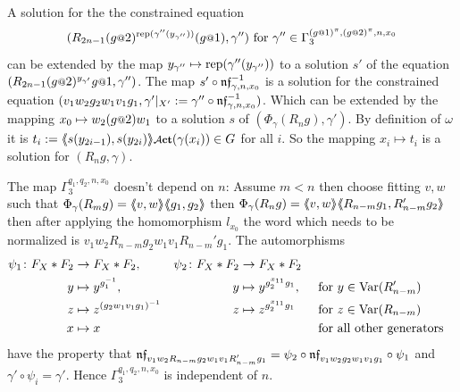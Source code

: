 \documentclass[a4paper,11pt]{amsart}
\begin{document}
 A solution for the the constrained equation
 \[(R_{2n-1}(g\at2)^{\textup{rep}(\gamma''({y_{\gamma''}}))}(g\at1),\gamma'')\textup{ for }\gamma'' \in \Gamma_3^{(g\at{1})^\pi,(g\at{2})^\pi,n,x_0}\]
 can be 
 extended by the map ${y_{\gamma''}}\mapsto \textup{rep}(\gamma''({y_{\gamma''}}))$ to a solution $s'$ 
 of the equation $(R_{2n-1} (g\at{2})^{{y_{\gamma'}}} g\at{1},\gamma'')$. The map $s'\circ \mathfrak{nf}_{\gamma,n,x_0}^{-1}$ 
 is a solution for the constrained equation $(v_1w_2g_2w_1v_1g_1,\gamma'|_{X'}:=\gamma'' \circ \mathfrak{nf}_{\gamma,n,x_0}^{-1})$.
 Which can be extended by the mapping $x_0\mapsto w_2(g\at{2})w_1$ to a solution $s$ of $(\Phi_\gamma(R_n g),\gamma')$.
 By definition of $\omega$ it is $t_i:=\pair{s(y_{2i-1}),s(y_{2i})}\act(\gamma(x_i)) \in G$ for all $i$. So the mapping $x_i\mapsto t_i$ is a solution for $(R_ng,\gamma)$.
 
 The map $\Gamma_3^{q_1,q_2,n,x_0}$ doesn't depend on %
 $n$: Assume $m<n$ then choose  
 fitting $v,w$ such that $\Phi_\gamma(R_mg)=\langle\negthickspace\langle v,w\rangle\negthickspace\rangle\langle\negthickspace\langle g_1,g_2\rangle\negthickspace\rangle$ then $\Phi_\gamma(R_ng)=\langle\negthickspace\langle v,w\rangle\negthickspace\rangle\langle\negthickspace\langle R_{n-m}g_1,R_{n-m}'g_2\rangle\negthickspace\rangle$ 
 then after applying the homomorphism $l_{x_0}$ 
 the word which needs to be normalized is $v_1w_2R_{n-m}g_2w_1v_1R_{n-m}'g_1$. The automorphisms
 \begin{align*}
 \psi_1 \colon F_X*F_2 &\to F_X*F_2, & \psi_2 \colon F_X*F_2 &\to F_X*F_2\\
 y &\mapsto y^{g_1^{-1}}, & y &\mapsto y^{g_2^{x_{11}}g_1}, & &\text{ for }y\in \textup{Var}(R_{n-m}')\\
 z &\mapsto z^{(g_2w_1v_1g_1)^{-1}}& z &\mapsto z^{g_2^{x_{11}}g_1}  & &\text{ for }z\in \textup{Var}(R_{n-m})\\
 x &\mapsto x & & & &\text{ for all other generators}
 \end{align*}
 have the property that $\mathfrak{nf}_{v_1w_2R_{n-m}g_2w_1v_1R_{n-m}'g_1} = \psi_2\circ\mathfrak{nf}_{v_1w_2g_2w_1v_1g_1}\circ \psi_1$ and 
 $\gamma' \circ \psi_i = \gamma'$. Hence $\Gamma_3^{q_1,q_2,n,x_0}$ is independent of $n$.
 
\end{document}
